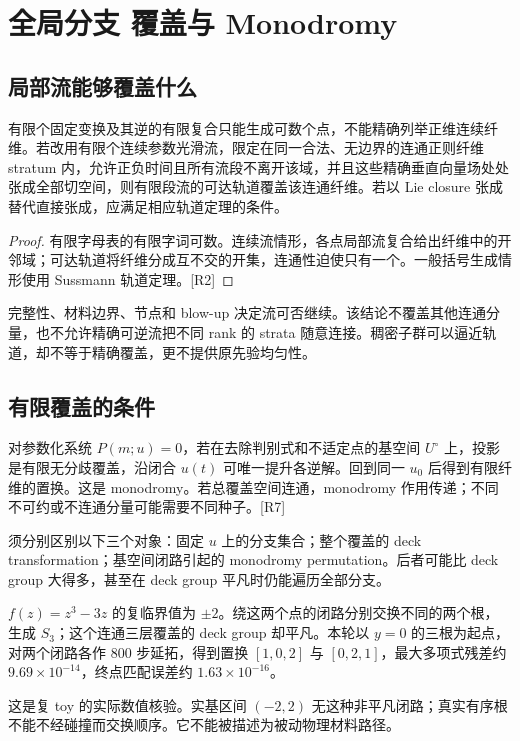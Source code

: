 \section{全局分支 覆盖与 Monodromy}

\subsection{局部流能够覆盖什么}

\begin{proposition}[生成元的覆盖资格]
有限个固定变换及其逆的有限复合只能生成可数个点，不能精确列举正维连续纤维。若改用有限个连续参数光滑流，限定在同一合法、无边界的连通正则纤维 stratum 内，允许正负时间且所有流段不离开该域，并且这些精确垂直向量场处处张成全部切空间，则有限段流的可达轨道覆盖该连通纤维。若以 Lie closure 张成替代直接张成，应满足相应轨道定理的条件。
\end{proposition}
\begin{proof}
有限字母表的有限字词可数。连续流情形，各点局部流复合给出纤维中的开邻域；可达轨道将纤维分成互不交的开集，连通性迫使只有一个。一般括号生成情形使用 Sussmann 轨道定理。[R2]
\end{proof}

完整性、材料边界、节点和 blow-up 决定流可否继续。该结论不覆盖其他连通分量，也不允许精确可逆流把不同 rank 的 strata 随意连接。稠密子群可以逼近轨道，却不等于精确覆盖，更不提供原先验均匀性。

\subsection{有限覆盖的条件}

对参数化系统 $P(m;u)=0$，若在去除判别式和不适定点的基空间 $U^\circ$ 上，投影是有限无分歧覆盖，沿闭合 $u(t)$ 可唯一提升各逆解。回到同一 $u_0$ 后得到有限纤维的置换。这是 monodromy。若总覆盖空间连通，monodromy 作用传递；不同不可约或不连通分量可能需要不同种子。[R7]

须分别区别以下三个对象：固定 $u$ 上的分支集合；整个覆盖的 deck transformation；基空间闭路引起的 monodromy permutation。后者可能比 deck group 大得多，甚至在 deck group 平凡时仍能遍历全部分支。

\begin{example}
$f(z)=z^3-3z$ 的复临界值为 $\pm2$。绕这两个点的闭路分别交换不同的两个根，生成 $S_3$；这个连通三层覆盖的 deck group 却平凡。本轮以 $y=0$ 的三根为起点，对两个闭路各作 800 步延拓，得到置换 $[1,0,2]$ 与 $[0,2,1]$，最大多项式残差约 $9.69\times10^{-14}$，终点匹配误差约 $1.63\times10^{-16}$。

这是复 toy 的实际数值核验。实基区间 $(-2,2)$ 无这种非平凡闭路；真实有序根不能不经碰撞而交换顺序。它不能被描述为被动物理材料路径。
\end{example}

